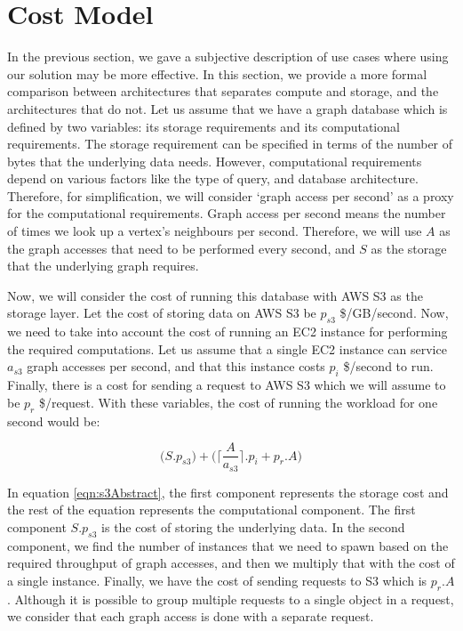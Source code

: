 \section{Cost Model}\label{sec:costModel}
In the previous section, we gave a subjective description of use cases where
using our solution may be more effective. In this section, we provide a
more formal comparison between architectures that separates
compute and storage, and the architectures that do not. Let us assume that we
have a graph database which is defined by two variables: its storage requirements and
its computational requirements. The storage requirement can be specified in
terms of the number of bytes that the underlying data needs. However,
computational requirements depend on various factors like the type of query,
and database architecture. Therefore, for simplification, we will consider
`graph access per second' as a proxy for the computational requirements. Graph
access per second means the number of times we look up a vertex's
neighbours per second. Therefore, we will use $A$ as the graph accesses that
need to be performed every second, and $S$ as the storage that the underlying
graph requires.

\smallskip
Now, we will consider the cost of running this database with AWS S3 as the
storage layer. Let the cost of storing data on AWS S3 be $p_{s3}$ \$/GB/second. Now,
we need to take into account the cost of running an EC2 instance for performing
the required computations. Let us assume that a single EC2 instance can service
$a_{s3}$ graph accesses per second, and that this instance costs $p_{i}$
\$/second to run. Finally, there is a cost for sending a request to AWS S3 which
we will assume to be $p_r$ \$/request. With these variables, the cost of
running the workload for one second would be:

\begin{equation}
    \label{eqn:s3Abstract}
    \bigl(S.p_{s3}\bigr) + \bigl(\Bigg\lceil \frac{A}{a_{s3}} \Bigg\rceil . p_i + p_r.A\bigr)
\end{equation}

In equation \ref{eqn:s3Abstract}, the first component represents the storage
cost and the rest of the equation represents the computational component. The
first component $S.p_{s3}$ is the cost of storing the underlying data. In the
second component, we find the number of instances that we need to spawn based on
the required throughput of graph accesses, and then we multiply that with the
cost of a single instance. Finally, we have the cost of sending requests to S3
which is $p_r.A$. Although it is possible to group multiple requests to a single
object in a request, we consider that each graph access is done with a separate
request.

